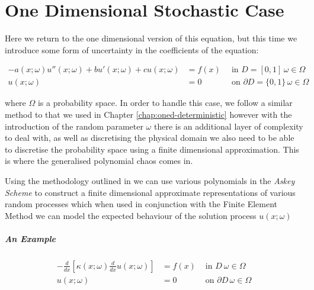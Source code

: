 \chapter{One Dimensional Stochastic Case}

Here we return to the one dimensional version of this equation, but this time
we introduce some form of uncertainty in the coefficients of the equation:

\begin{equation}\label{eq:oned-stochastic}
  \begin{aligned}
    -a(x;\omega)u''(x;\omega) + bu'(x;\omega) + cu(x;\omega)
                     &= f(x)\, &\text { in } D = [0,1]\, \omega \in \Omega \\
    u(x;\omega) &= 0 &\text{ on } \partial D = \{0,1\}\, \omega \in \Omega
  \end{aligned}
\end{equation}

where $\Omega$ is a probability space. In order to handle this case, we follow a
similar method to that we used in Chapter \ref{chap:oned-deterministic} however with
the introduction of the random parameter $\omega$ there is an additional layer of
complexity to deal with, as well as discretising the physical domain we also need to
be able to discretise the probability space using a finite dimensional approximation.
This is where the generalised polynomial chaos comes in.

Using the methodology outlined in \cite{general-poly-chaos} we can use various
polynomials in the \textit{Askey Scheme} to construct a finite dimensional approximate
representations of various random processes which when used in conjunction with the
Finite Element Method we can model the expected behaviour of the solution process
$u(x;\omega)$

\paragraph{An Example}

\begin{equation}
  \begin{aligned}
    -\frac{d}{dx}\left[\kappa(x;\omega)\frac{d}{dx}u(x;\omega)\right] &= f(x)
        & \text{ in } D\ \omega \in \Omega \\
     u(x;\omega) &= 0 &\text{ on } \partial D\, \omega \in \Omega
  \end{aligned}
\end{equation}

